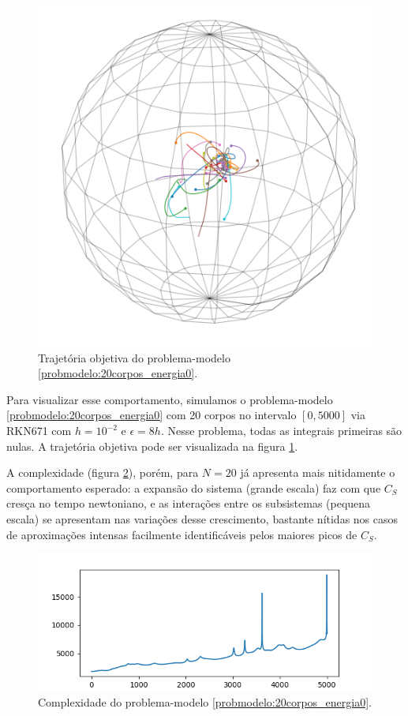 \begin{figure}
    \centering
    \includegraphics[width=0.5\linewidth]{tcc//img/20corpos_energia0_posicoes_3d_sd.png}
    \caption{Trajetória objetiva do problema-modelo \ref{probmodelo:20corpos_energia0}.}
    \label{fig:20corpos_trajetorias_sd}
\end{figure}

Para visualizar esse comportamento, simulamos o problema-modelo \ref{probmodelo:20corpos_energia0} com 20 corpos no intervalo $[0,5000]$ via RKN671 com $h=10^{-2}$ e $\epsilon=8h$. Nesse problema, todas as integrais primeiras são nulas. A trajetória objetiva pode ser visualizada na figura \ref{fig:20corpos_trajetorias_sd}.

A complexidade (figura \ref{fig:20corpos_complexidade}), porém, para $N=20$ já apresenta mais nitidamente o comportamento esperado: a expansão do sistema (grande escala) faz com que $C_S$ cresça no tempo newtoniano, e as interações entre os subsistemas (pequena escala) se apresentam nas variações desse crescimento, bastante nítidas nos casos de aproximações intensas facilmente identificáveis pelos maiores picos de $C_S$.

\begin{figure}[H]
    \centering
    \includegraphics[width=0.8\linewidth]{tcc//img/20corpos_energia0_complexidade.png}
    \caption{Complexidade do problema-modelo \ref{probmodelo:20corpos_energia0}.}
    \label{fig:20corpos_complexidade}
\end{figure}

